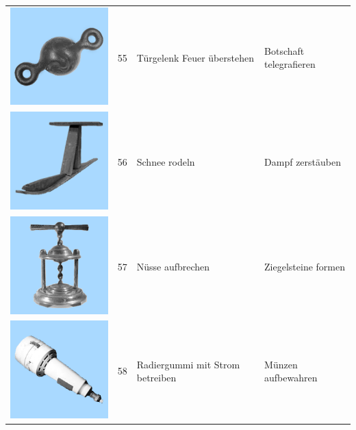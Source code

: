 \documentclass[
  english,
  doc,12pt,twoside,floatsintext]{apa7}
\begin{document}
\begin{center}
\begin{ThreePartTable}
\begin{longtable}{llll}
\includegraphics[valign=c, scale=0.19]{../materials/unfamiliar/55.png} & 55 & Türgelenk Feuer überstehen & Botschaft telegrafieren\\
\includegraphics[valign=c, scale=0.19]{../materials/unfamiliar/56.png} & 56 & Schnee rodeln & Dampf zerstäuben\\
\includegraphics[valign=c, scale=0.19]{../materials/unfamiliar/57.png} & 57 & Nüsse aufbrechen & Ziegelsteine formen\\
\includegraphics[valign=c, scale=0.19]{../materials/unfamiliar/58.png} & 58 & Radiergummi mit Strom betreiben & Münzen aufbewahren\\

\end{longtable}
\end{ThreePartTable}
\end{center}
\end{document}

